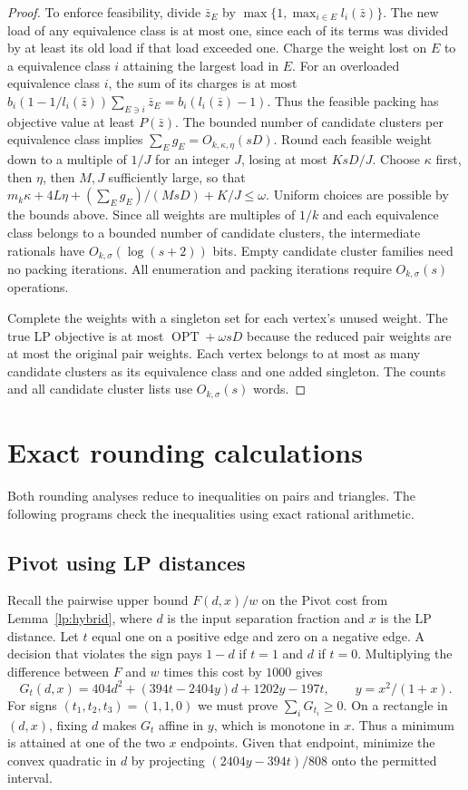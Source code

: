 \documentclass[11pt]{article}
\newcommand{\OPT}{\operatorname{OPT}}
\begin{document}
\begin{proof}
To enforce feasibility, divide $\bar z_E$ by
$\max\{1,\max_{i\in E}l_i(\bar z)\}$. The new load of any equivalence class is
at most one, since each of its terms was divided by at least its
old load if that load exceeded one. Charge the weight lost on $E$
to a equivalence class $i$ attaining the largest load in $E$. For an overloaded
equivalence class $i$, the sum of its charges is at most
$b_i(1-1/l_i(\bar z))\sum_{E\ni i}\bar z_E=b_i(l_i(\bar z)-1)$.
Thus the feasible packing has objective value at least $P(\bar z)$.
The bounded number of candidate clusters per equivalence class implies $\sum_Eg_E=O_{k,\kappa,\eta}(sD)$.
Round each feasible weight down to a multiple of $1/J$ for an integer
$J$, losing at most $KsD/J$. Choose $\kappa$ first, then $\eta$,
then $M,J$ sufficiently large, so that
$m_k\kappa+4L\eta+(\sum_Eg_E)/(MsD)+K/J\le\omega$. Uniform choices
are possible by the bounds above. Since all weights are multiples of
$1/k$ and each equivalence class belongs to a bounded number of candidate clusters, the intermediate rationals
have $O_{k,\sigma}(\log(s+2))$ bits. Empty candidate cluster families need no packing iterations. All
enumeration and packing iterations require $O_{k,\sigma}(s)$ operations.

Complete the weights with a singleton set for each vertex's
unused weight. The true LP objective is at most
$\OPT+\omega sD$ because the reduced pair weights are at most the
original pair weights. Each vertex belongs to at most as many
candidate clusters as its equivalence class and one added singleton. The counts
and all candidate cluster lists use $O_{k,\sigma}(s)$ words.
\end{proof}

\section{Exact rounding calculations}
\label{app:certificates}

Both rounding analyses reduce to inequalities on pairs and triangles.
The following programs check the inequalities using exact rational
arithmetic.

\subsection{Pivot using LP distances}
\label{app:hybrid}
Recall the pairwise upper bound $F(d,x)/w$ on the Pivot cost from Lemma~\ref{lp:hybrid},
where $d$ is the input separation fraction and $x$ is the LP distance.
Let $t$ equal one on a positive edge and zero on a negative edge.
A decision that violates the sign pays $1-d$ if $t=1$ and $d$ if $t=0$.
Multiplying the difference between $F$ and $w$ times this cost by
$1000$ gives
\[
 G_t(d,x)=404d^2+(394t-2404y)d+1202y-197t,\qquad y=x^2/(1+x).
\]
For signs $(t_1,t_2,t_3)=(1,1,0)$ we must prove $\sum_iG_{t_i}\ge0$.
On a rectangle in $(d,x)$, fixing $d$ makes $G_t$ affine in $y$,
which is monotone in $x$. Thus a minimum is attained at one of the
two $x$ endpoints. Given that endpoint, minimize the convex quadratic
in $d$ by projecting $(2404y-394t)/808$ onto the permitted interval.
\end{document}

